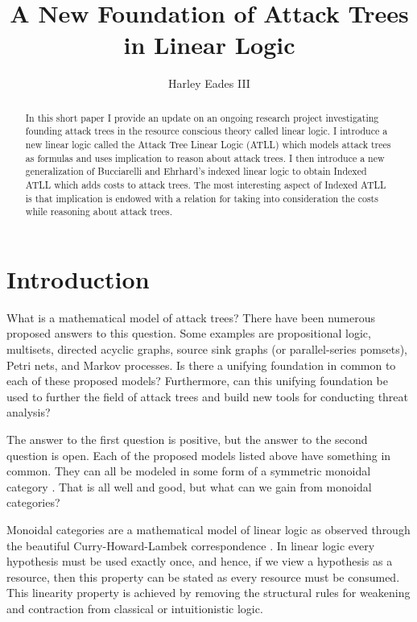 \documentclass{llncs}
\date{}
\begin{document}
\title{A New Foundation of Attack Trees in Linear Logic}

\author{Harley Eades III}

\maketitle 

\begin{abstract}
  In this short paper I provide an update on an ongoing research
  project investigating founding attack trees in the resource
  conscious theory called linear logic.  I introduce a new linear
  logic called the Attack Tree Linear Logic (ATLL) which models attack
  trees as formulas and uses implication to reason about attack trees.
  I then introduce a new generalization of Bucciarelli and Ehrhard’s
  indexed linear logic to obtain Indexed ATLL which adds costs to
  attack trees.  The most interesting aspect of Indexed ATLL is that
  implication is endowed with a relation for taking into consideration
  the costs while reasoning about attack trees.
\end{abstract}

\section{Introduction}
\label{sec:introduction}
What is a mathematical model of attack trees?  There have been
numerous proposed answers to this question.  Some examples are
propositional logic, multisets, directed acyclic graphs, source sink
graphs (or parallel-series pomsets), Petri nets, and Markov processes.
Is there a unifying foundation in common to each of these proposed
models?  Furthermore, can this unifying foundation be used to further
the field of attack trees and build new tools for conducting threat
analysis?

The answer to the first question is positive, but the answer to the
second question is open.  Each of the proposed models listed above
have something in common.  They can all be modeled in some form of a
symmetric monoidal category
\cite{Tzouvaras:1998,Brown:1991,Fiore:2013,FrancescoAlbasini2010}.
That is all well and good, but what can we gain from monoidal
categories?

Monoidal categories are a mathematical model of linear logic as
observed through the beautiful Curry-Howard-Lambek correspondence
\cite{Mellies:2009}.  In linear logic every hypothesis must be used
exactly once, and hence, if we view a hypothesis as a resource, then
this property can be stated as every resource must be consumed.  This
linearity property is achieved by removing the structural rules for
weakening and contraction from classical or intuitionistic logic.
\end{document}
